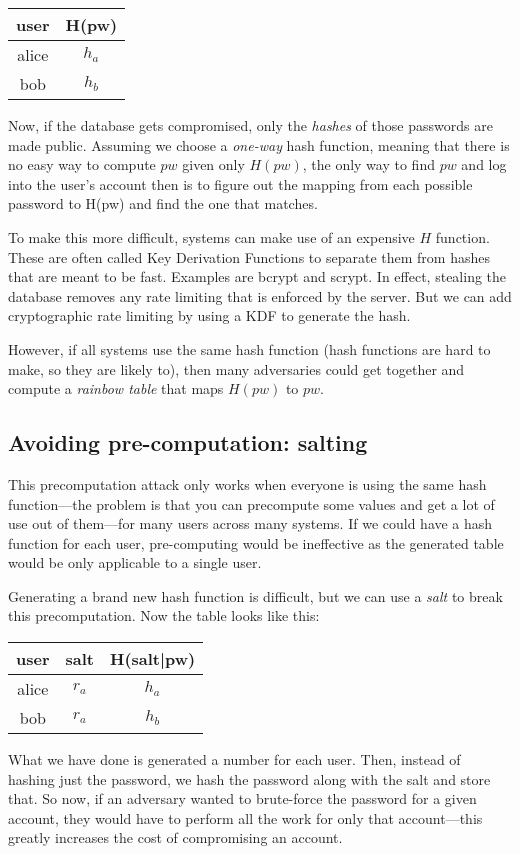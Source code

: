 \begin{tabular}{c|c}
	user & H(pw) \\
	\hline
	alice & $h_a$ \\
	bob & $h_b$ \\
\end{tabular}

Now, if the database gets compromised, only the \textit{hashes} of those passwords are made public. Assuming we choose a \textit{one-way} hash function, meaning that there is no easy way to compute $pw$ given only $H(pw)$, the only way to find $pw$ and log into the user's account then is to figure out the mapping from each possible password to H(pw) and find the one that matches. 

To make this more difficult, systems can make use of an expensive $H$ function. These are often called Key Derivation Functions to separate them from hashes that are meant to be fast. Examples are bcrypt and scrypt. In effect, stealing the database removes any rate limiting that is enforced by the server. But we can add cryptographic rate limiting by using a KDF to generate the hash.

However, if all systems use the same hash function (hash functions are hard to make, so they are likely to), then many adversaries could get together and compute a \textit{rainbow table} that maps $H(pw)$ to $pw$. 

\subsection{Avoiding pre-computation: salting}
This precomputation attack only works when everyone is using the same hash function---the problem is that you can precompute some values and get a lot of use out of them---for many users across many systems. If we could have a hash function for each user, pre-computing would be ineffective as the generated table would be only applicable to a single user.

Generating a brand new hash function is difficult, but we can use a \textit{salt} to break this precomputation. Now the table looks like this:

\begin{tabular}{c|c|c}
	user & salt & H(salt|pw) \\
	\hline
	alice & $r_a$ & $h_a$ \\
	bob & $r_a$ & $h_b$ \\
\end{tabular}

What we have done is generated a number for each user. Then, instead of hashing just the password, we hash the password along with the salt and store that. So now, if an adversary wanted to brute-force the password for a given account, they would have to perform all the work for only that account---this greatly increases the cost of compromising an account. 


